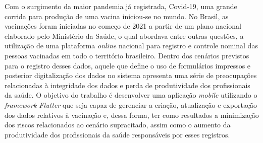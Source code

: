 %
%


Com o surgimento da maior pandemia já registrada, Covid-19, uma grande corrida para produção de uma vacina iniciou-se no mundo. No Brasil, as vacinações foram iniciadas no começo de 2021 a partir de um plano nacional elaborado pelo Ministério da Saúde, o qual abordava entre outras questões, a utilização de uma plataforma \textit{online} nacional para registro e controle nominal das pessoas vacinadas em todo o território brasileiro. Dentro dos cenários previstos para o registro desses dados, aquele que define o uso de formulários impressos e posterior digitalização dos dados no sistema apresenta uma série de preocupações relacionadas à integridade dos dados e perda de produtividade dos profissionais da saúde. O objetivo do trabalho é desenvolver uma aplicação \textit{mobile} utilizando o \textit{framework Flutter} que seja capaz de gerenciar a criação, atualização e exportação dos dados relativos à vacinação e, dessa forma, ter como resultados a minimização dos riscos relacionados ao cenário supracitado, assim como o aumento da produtividade dos profissionais da saúde responsáveis por esses registros.

